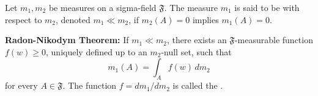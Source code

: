 Let $m_1, m_2$ be measures on a sigma-field $\mathfrak{F}$. The measure $m_1$ is said to be  with respect to $m_2$, denoted $m_1 \ll m_2$, if $m_2(A) = 0$ implies $m_1(A) = 0$.

\textbf{Radon-Nikodym Theorem:} If $m_1 \ll m_2$, there exists an $\mathfrak{F}$-measurable function $f(w) \geq 0$, uniquely defined up to an $m_2$-null set, such that
$$m_1(A) = \int_A f(w) \, dm_2$$
for every $A \in \mathfrak{F}$. The function $f = dm_1/dm_2$ is called the .
